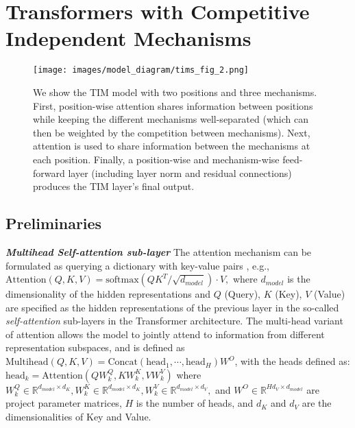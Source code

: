 \documentclass{article}
\begin{document}

\section{Transformers with Competitive Independent Mechanisms}

\begin{figure}%
    \centering
    \texttt{[image: images/model\_diagram/tims\_fig\_2.png]}
    \vspace{-3mm}
    \caption{We show the TIM model with two positions and three mechanisms.  First, position-wise attention shares information between positions while keeping the different mechanisms well-separated (which can then be weighted by the competition between mechanisms).  Next, attention is used to share information between the mechanisms at each position.  Finally, a position-wise and mechanism-wise feed-forward layer (including layer norm and residual connections) produces the TIM layer's final output.  }
    \label{fig:timsfig}
    \vspace{-3mm}

\end{figure}

\subsection{Preliminaries}

{\bfseries \itshape Multihead Self-attention sub-layer } The attention mechanism can be formulated as querying a dictionary with key-value pairs \citep{bahdanau2014neural,vaswani2017attention}, e.g., 
\
$\text{Attention}(Q,K,V)=\text{softmax}({QK^T}/{\sqrt{d_{\mathit{model}}}})\cdot V, $
where $d_\mathit{model}$ is the dimensionality of the hidden representations and $Q$ (Query), $K$ (Key), $V$ (Value) are specified as the hidden representations of the previous layer in the so-called \emph{self-attention} sub-layers in the Transformer architecture. The multi-head variant of attention allows the model to jointly attend to information from different representation subspaces, and is defined as
$\text{Multihead}(Q,K,V) = \text{Concat} (\text{head}_1,\cdots,\text{head}_H)W^O$, with the heads defined as: $\text{head}_k = \text{Attention}(QW_k^Q, KW_k^K,VW_k^V)$ where $W_k^Q\in \mathbb{R}^{d_\mathit{model}\times d_K}, W_k^K\in \mathbb{R}^{d_\mathit{model}\times d_K}, W_k^V\in \mathbb{R}^{d_\mathit{model}\times d_V},$ and $W^O\in \mathbb{R}^{Hd_V \times d_\mathit{model}}$ are project parameter matrices, $H$ is the number of heads, and $d_K$ and $d_V$ are the dimensionalities of Key and Value. 
\end{document}
